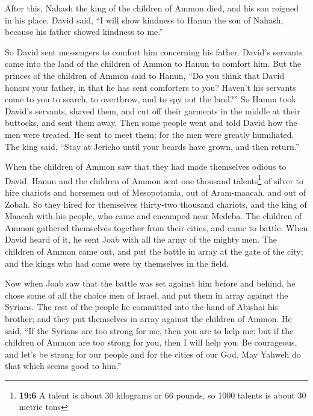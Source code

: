  After this, Nahash the king of the children of Ammon
died, and his son reigned in his place.  David said, ``I
will show kindness to Hanun the son of Nahash, because his father showed
kindness to me.''

So David sent messengers to comfort him concerning his father. David's
servants came into the land of the children of Ammon to Hanun to comfort
him.  But the princes of the children of Ammon said to
Hanun, ``Do you think that David honors your father, in that he has sent
comforters to you? Haven't his servants come to you to search, to
overthrow, and to spy out the land?''  So Hanun took
David's servants, shaved them, and cut off their garments in the middle
at their buttocks, and sent them away.  Then some people
went and told David how the men were treated. He sent to meet them; for
the men were greatly humiliated. The king said, ``Stay at Jericho until
your beards have grown, and then return.''

 When the children of Ammon saw that they had made
themselves odious to David, Hanun and the children of Ammon sent one
thousand talents\footnote{\textbf{19:6} A talent is about 30 kilograms
  or 66 pounds, so 1000 talents is about 30 metric tons} of silver to
hire chariots and horsemen out of Mesopotamia, out of Aram-maacah, and
out of Zobah.  So they hired for themselves thirty-two
thousand chariots, and the king of Maacah with his people, who came and
encamped near Medeba. The children of Ammon gathered themselves together
from their cities, and came to battle.  When David heard
of it, he sent Joab with all the army of the mighty men. 
The children of Ammon came out, and put the battle in array at the gate
of the city; and the kings who had come were by themselves in the field.

 Now when Joab saw that the battle was set against him
before and behind, he chose some of all the choice men of Israel, and
put them in array against the Syrians.  The rest of the
people he committed into the hand of Abishai his brother; and they put
themselves in array against the children of Ammon.  He
said, ``If the Syrians are too strong for me, then you are to help me;
but if the children of Ammon are too strong for you, then I will help
you.  Be courageous, and let's be strong for our people
and for the cities of our God. May Yahweh do that which seems good to
him.''

